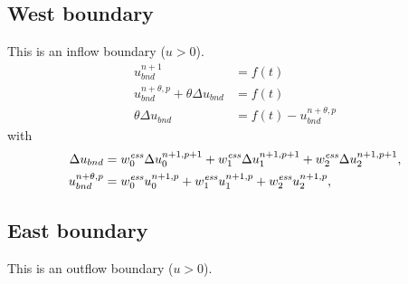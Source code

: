 \subsection{West boundary}
This is an inflow boundary ($u>0$).
\begin{align}
    u^{n+1}_{bnd} &= f(t)
    \\
    u^{n+\theta, p}_{bnd} + \theta \Delta u_{bnd}  &= f(t)
    \\
    \theta \Delta u_{bnd} & = f(t) - u^{n+\theta, p}_{bnd}
\end{align}
with
\begin{align}
    \Delta u_{bnd} & =
     w^{\it ess}_0 \Delta u^{n+1,p+1}_0
+ w^{\it ess}_1 \Delta u^{n+1,p+1}_1
+ w^{\it ess}_2 \Delta u^{n+1,p+1}_2,
    \\
    u^{n+\theta, p}_{bnd} & =
     w^{\it ess}_0 u^{n+1,p}_0
    + w^{\it ess}_1 u^{n+1,p}_1
    + w^{\it ess}_2 u^{n+1,p}_2,
\end{align}

\subsection{East boundary}
This is an outflow boundary ($u>0$).

\notyet

